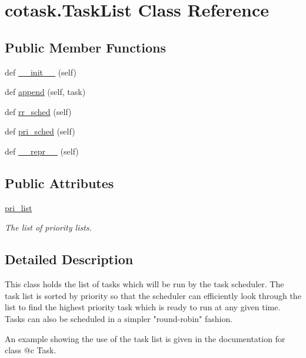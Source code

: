 \hypertarget{classcotask_1_1TaskList}{}\section{cotask.\+Task\+List Class Reference}
\label{classcotask_1_1TaskList}
\subsection*{Public Member Functions}
\begin{DoxyCompactItemize}
\item 
def \mbox{\hyperlink{classcotask_1_1TaskList_a288413cdeddf60664542a92ce201200a}{\+\_\+\+\_\+init\+\_\+\+\_\+}} (self)
\item 
def \mbox{\hyperlink{classcotask_1_1TaskList_aa690015d692390e17cb777ff367ae159}{append}} (self, task)
\item 
def \mbox{\hyperlink{classcotask_1_1TaskList_a01614098aedc87b465d5525c6ccb47ce}{rr\+\_\+sched}} (self)
\item 
def \mbox{\hyperlink{classcotask_1_1TaskList_a5f7b264614e8e22c28d4c1509e3f30d8}{pri\+\_\+sched}} (self)
\item 
def \mbox{\hyperlink{classcotask_1_1TaskList_aa0632311ba902d3e5d75167dd4215dda}{\+\_\+\+\_\+repr\+\_\+\+\_\+}} (self)
\end{DoxyCompactItemize}
\subsection*{Public Attributes}
\begin{DoxyCompactItemize}
\item 
\mbox{\hyperlink{classcotask_1_1TaskList_aac6e53cb4fec80455198ff85c85a4b51}{pri\+\_\+list}}
\begin{DoxyCompactList}\small\item\em The list of priority lists. \end{DoxyCompactList}\end{DoxyCompactItemize}


\subsection{Detailed Description}
\begin{DoxyVerb}This class holds the list of tasks which will be run by the task 
scheduler. The task list is sorted by priority so that the scheduler can 
efficiently look through the list to find the highest priority task which
is ready to run at any given time. Tasks can also be scheduled in a 
simpler "round-robin" fashion. 

An example showing the use of the task list is given in the documentation
for class @c Task. \end{DoxyVerb}
 

